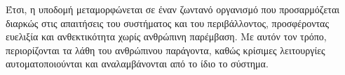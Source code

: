 Έτσι, η υποδομή μεταμορφώνεται σε έναν ζωντανό οργανισμό που προσαρμόζεται
διαρκώς στις απαιτήσεις του συστήματος και του περιβάλλοντος, προσφέροντας
ευελιξία και ανθεκτικότητα χωρίς ανθρώπινη παρέμβαση. Με αυτόν τον τρόπο,
περιορίζονται τα λάθη του ανθρώπινου παράγοντα, καθώς κρίσιμες λειτουργίες
αυτοματοποιούνται και αναλαμβάνονται από το ίδιο το σύστημα.
